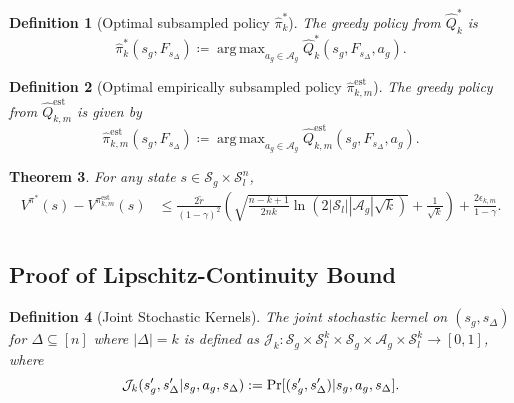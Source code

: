 \documentclass{article}
\theoremstyle{plain}
\newtheorem{theorem}{Theorem}[section]
\theoremstyle{definition}
\newtheorem{definition}[theorem]{Definition}
\def\est{\mathrm{est}}
\DeclareMathOperator*{\argmax}{arg\,max}
\begin{document}
\begin{definition}[Optimal subsampled policy $\hat{\pi}_k^*$]
    \emph{The greedy policy from $\hat{Q}_k^*$ is}
\begin{equation}\hat{\pi}_k^*(s_g, F_{s_{\Delta }}) \coloneq \mathop{\argmax}_{a_g \in\mathcal{A}_g} \hat{Q}_k^*(s_g, F_{s_{\Delta}}, a_g).\end{equation}
\end{definition}
\begin{definition}[Optimal empirically subsampled policy $\hat{\pi}_{k,m}^\est$]
    \emph{The greedy policy from $\hat{Q}_{k,m}^\est$ is given by }\begin{equation}\hat{\pi}_{k,m}^\est(s_g,F_{s_\Delta})\coloneqq \mathop{\argmax}_{a_g\in \mathcal{A}_g}\hat{Q}_{k,m}^\est(s_g, F_{s_{\Delta}}, a_g).\end{equation}
\end{definition}



\begin{theorem} {For any state $s\in\mathcal{S}_g\times\mathcal{S}_l^n$},\label{theorem: performance_difference_lemma_applied}
\begin{align*}V^{\pi^*}(s) - V^{{{\pi}}^\est_{k,m}}(s) &\leq \frac{2\tilde{r}}{(1-\gamma)^2}\left(\sqrt{\frac{n-k+1}{2nk} \ln(2|\mathcal{S}_l||\mathcal{A}_g|\sqrt{k})}+\frac{1}{\sqrt{k}}\right)+\frac{2\epsilon_{k,m}}{1-\gamma}.\\ \end{align*}
\end{theorem}
 


\subsection{Proof of Lipschitz-Continuity Bound}

\begin{definition}[Joint Stochastic Kernels] 
\label{definition: joint_transition_probability}\emph{The joint stochastic kernel on $(s_g,s_\Delta)$ for $\Delta\subseteq [n]$ where $|\Delta|=k$ is defined as $\mathcal{J}_k:\mathcal{S}_g\times\mathcal{S}_l^{k}\times\mathcal{S}_g\times\mathcal{A}_g\times\mathcal{S}_l^{k}\to[0,1]$, where} \begin{equation}\mathcal{J}_k(s_g',s_\Delta'|s_g, a_g, s_\Delta) := \Pr[(s_g',s_\Delta')|s_g, a_g, s_\Delta].\\\end{equation}
\end{definition}
\end{document}
